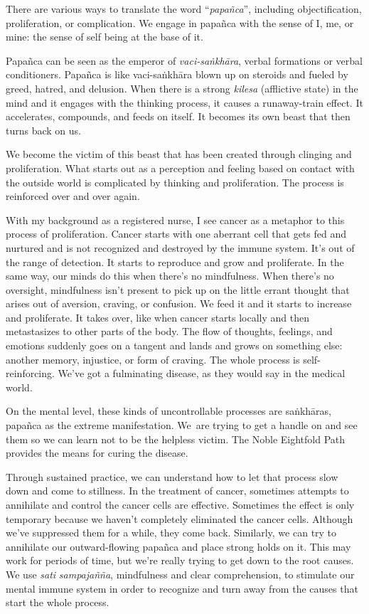 There are various ways to translate the word ``\emph{papañca}'', including objectification, proliferation, or complication. We engage in papañca with the sense of I, me, or mine: the sense of self being at the base of it.

Papañca can be seen as the emperor of \emph{vaci-saṅkhāra}, verbal formations or verbal conditioners. Papañca is like vaci-saṅkhāra blown up on steroids and fueled by greed, hatred, and delusion. When there is a strong \emph{kilesa} (afflictive state) in the mind and it engages with the thinking process, it causes a runaway-train effect. It accelerates, compounds, and feeds on itself. It becomes its own beast that then turns back on us.

We become the victim of this beast that has been created through clinging and proliferation. What starts out as a perception and feeling based on contact with the outside world is complicated by thinking and proliferation. The process is reinforced over and over again.

With my background as a registered nurse, I see cancer as a metaphor to this process of proliferation. Cancer starts with one aberrant cell that gets fed and nurtured and is not recognized and destroyed by the immune system. It's out of the range of detection. It starts to reproduce and grow and proliferate. In the same way, our minds do this when there's no mindfulness. When there's no oversight, mindfulness isn't present to pick up on the little errant thought that arises out of aversion, craving, or confusion. We feed it and it starts to increase and proliferate. It takes over, like when cancer starts locally and then metastasizes to other parts of the body. The flow of thoughts, feelings, and emotions suddenly goes on a tangent and lands and grows on something else: another memory, injustice, or form of craving. The whole process is self-reinforcing. We've got a fulminating disease, as they would say in the medical world.

On the mental level, these kinds of uncontrollable \mbox{processes} are saṅkhāras, papañca as the extreme manifestation. \mbox{We are} trying to get a handle on and see them so we can learn not to be the helpless victim. The Noble Eightfold Path provides the means for curing the disease.

Through sustained practice, we can understand how to let that process slow down and come to stillness. In the treatment of cancer, sometimes attempts to annihilate and control the cancer cells are effective. Sometimes the effect is only temporary because we haven't completely eliminated the cancer cells. Although we've suppressed them for a while, they come back. Similarly, we can try to annihilate our outward-flowing papañca and place strong holds on it. This may work for periods of time, but we're really trying to get down to the root causes. We use \emph{sati} \emph{sampajañña}, mindfulness and clear comprehension, to stimulate our mental immune system in order to recognize and turn away from the causes that start the whole process.

